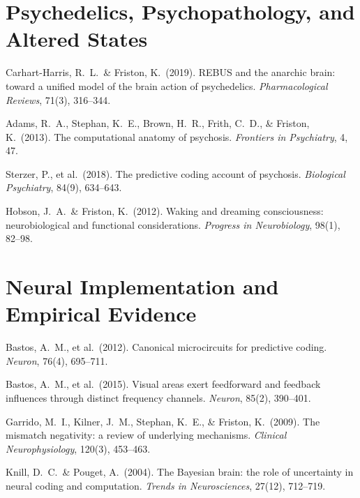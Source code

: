 \documentclass[11pt,a4paper]{report}
\begin{document}
\section*{Psychedelics, Psychopathology, and Altered States}
\begin{enumerate}[label={[\arabic*]}, leftmargin=2.5em, start=16]
  \item Carhart-Harris, R.\ L.\ \& Friston, K.\ (2019). REBUS and the anarchic brain: toward a unified model of the brain action of psychedelics. \textit{Pharmacological Reviews}, 71(3), 316--344.
  \item Adams, R.\ A., Stephan, K.\ E., Brown, H.\ R., Frith, C.\ D., \& Friston, K.\ (2013). The computational anatomy of psychosis. \textit{Frontiers in Psychiatry}, 4, 47.
  \item Sterzer, P., et al.\ (2018). The predictive coding account of psychosis. \textit{Biological Psychiatry}, 84(9), 634--643.
  \item Hobson, J.\ A.\ \& Friston, K.\ (2012). Waking and dreaming consciousness: neurobiological and functional considerations. \textit{Progress in Neurobiology}, 98(1), 82--98.
\end{enumerate}

\section*{Neural Implementation and Empirical Evidence}
\begin{enumerate}[label={[\arabic*]}, leftmargin=2.5em, start=20]
  \item Bastos, A.\ M., et al.\ (2012). Canonical microcircuits for predictive coding. \textit{Neuron}, 76(4), 695--711.
  \item Bastos, A.\ M., et al.\ (2015). Visual areas exert feedforward and feedback influences through distinct frequency channels. \textit{Neuron}, 85(2), 390--401.
  \item Garrido, M.\ I., Kilner, J.\ M., Stephan, K.\ E., \& Friston, K.\ (2009). The mismatch negativity: a review of underlying mechanisms. \textit{Clinical Neurophysiology}, 120(3), 453--463.
  \item Knill, D.\ C.\ \& Pouget, A.\ (2004). The Bayesian brain: the role of uncertainty in neural coding and computation. \textit{Trends in Neurosciences}, 27(12), 712--719.
\end{enumerate}
\end{document}
